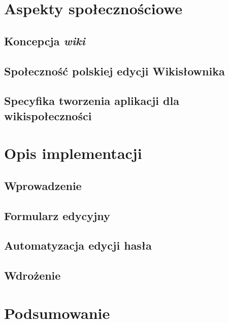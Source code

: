\documentclass{pracamgr}
\begin{document}

\chapter{Aspekty społecznościowe}
\section{Koncepcja \emph{wiki}}
\section{Społeczność polskiej edycji Wikisłownika}
\label{sec:plsoc}

\section{Specyfika tworzenia aplikacji dla wikispołeczności}

\chapter{Opis implementacji}
\label{chap:impl}
\section{Wprowadzenie}
\section{Formularz edycyjny}
\section{Automatyzacja edycji hasła}
\section{Wdrożenie}

\chapter{Podsumowanie}


\appendix


\end{document}
